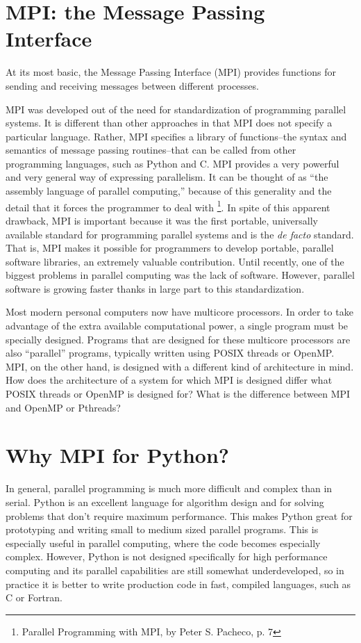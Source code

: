 \section*{MPI: the Message Passing Interface}
At its most basic, the Message Passing Interface (MPI) provides functions for sending 
and receiving messages between different processes.

MPI was developed out of the need for standardization of programming parallel systems. 
It is different than other approaches in that MPI does not specify a particular language. 
Rather, MPI specifies a library of functions--the syntax and semantics of message passing routines--that can be called from other programming languages, 
such as Python and C. MPI provides a very powerful and very general way of expressing parallelism. 
It can be thought of as ``the assembly language of parallel computing,'' because of this 
generality and the detail that it forces the programmer to deal with
\footnote{Parallel Programming with MPI, by Peter S. Pacheco, p. 7}.
In spite of this apparent drawback, MPI is important because it was the first portable, 
universally available standard for programming parallel systems and is the \emph{de facto} standard. 
That is, MPI makes it possible for programmers to develop portable, parallel software libraries,
an extremely valuable contribution.
Until recently, one of the biggest problems in parallel computing was the lack of software. 
However, parallel software is growing faster thanks in large part to this standardization. 

\begin{problem}
Most modern personal computers now have multicore processors. 
In order to take advantage of the extra available computational power, a single program must be specially designed. 
Programs that are designed for these multicore processors are also ``parallel'' programs, typically written using POSIX threads or OpenMP.
MPI, on the other hand, is designed with a different kind of architecture in mind. 
How does the architecture of a system for which MPI is designed differ what POSIX threads or OpenMP is designed for? 
What is the difference between MPI and OpenMP or Pthreads?
\end{problem}

\section*{Why MPI for Python?}
In general, parallel programming is much more difficult and complex than in serial. 
Python is an excellent language for algorithm design and for solving problems that 
don't require maximum performance. 
This makes Python great for prototyping and writing small to medium sized parallel programs. 
This is especially useful in parallel computing, where the code becomes especially complex. 
However, Python is not designed specifically for high performance computing and its 
parallel capabilities are still somewhat underdeveloped, so in practice it is better 
to write production code in fast, compiled languages, such as C or Fortran.


